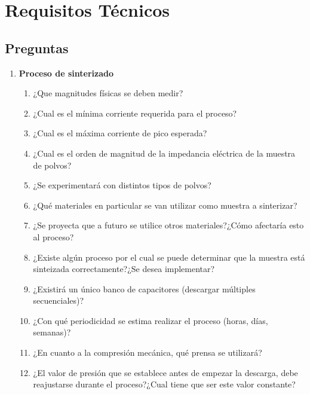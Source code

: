 \documentclass[12pt]{article}
\begin{document}
\section{Requisitos Técnicos}

\subsection{Preguntas}
  
 \begin{enumerate} 
      \item \textbf{ Proceso de sinterizado }
	\begin{enumerate}
	  \item ¿Que magnitudes físicas se deben medir?
	  \item ¿Cual es el mínima corriente requerida para el proceso?
	  \item ¿Cual es el máxima corriente de pico esperada?
	  \item ¿Cual es el orden de magnitud de la impedancia eléctrica de la muestra de polvos?
	  \item ¿Se experimentará con distintos tipos de polvos?
          \item ¿Qué materiales en particular se van utilizar como muestra a sinterizar?
          \item ¿Se proyecta que a futuro se utilice otros materiales?¿Cómo afectaría esto al proceso?
          \item ¿Existe algún proceso por el cual se puede determinar que la muestra está sinteizada correctamente?¿Se desea implementar?
	  \item ¿Existirá un único banco de capacitores (descargar múltiples secuenciales)?
	  \item ¿Con qué periodicidad se estima realizar el proceso (horas, días, semanas)?
	  \item ¿En cuanto a la compresión mecánica, qué prensa se utilizará?
	  \item ¿El valor de presión que se establece antes de empezar la descarga, debe reajustarse durante el proceso?¿Cual tiene que ser este valor constante?

	\end{enumerate}
	  

\end{enumerate}
\end{document}
